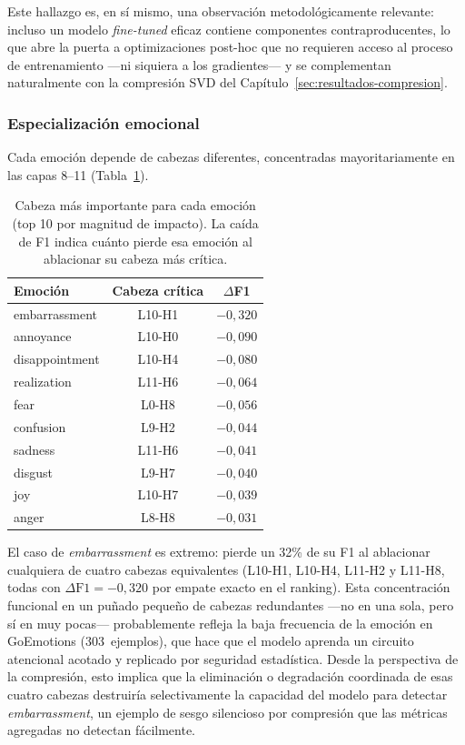 Este hallazgo es, en sí mismo, una observación metodológicamente
relevante: incluso un modelo \emph{fine-tuned} eficaz contiene componentes
contraproducentes, lo que abre la puerta a optimizaciones post-hoc
que no requieren acceso al proceso de entrenamiento ---ni siquiera a
los gradientes--- y se complementan naturalmente con la compresión
SVD del Capítulo~\ref{sec:resultados-compresion}.

\subsubsection{Especialización emocional}

Cada emoción depende de cabezas diferentes, concentradas
mayoritariamente en las capas 8--11
(Tabla~\ref{tab:head-emociones}).

\begin{table}[ht]
\centering
\caption{Cabeza más importante para cada emoción (top 10 por magnitud
de impacto). La caída de F1 indica cuánto pierde esa emoción al
ablacionar su cabeza más crítica.}
\label{tab:head-emociones}
\begin{tabular}{lcc}
\toprule
\textbf{Emoción} & \textbf{Cabeza crítica} & \textbf{$\Delta$F1} \\
\midrule
embarrassment  & L10-H1 & $-0{,}320$ \\
annoyance      & L10-H0 & $-0{,}090$ \\
disappointment & L10-H4 & $-0{,}080$ \\
realization    & L11-H6 & $-0{,}064$ \\
fear           & L0-H8  & $-0{,}056$ \\
confusion      & L9-H2  & $-0{,}044$ \\
sadness        & L11-H6 & $-0{,}041$ \\
disgust        & L9-H7  & $-0{,}040$ \\
joy            & L10-H7 & $-0{,}039$ \\
anger          & L8-H8  & $-0{,}031$ \\
\bottomrule
\end{tabular}
\end{table}

El caso de \emph{embarrassment} es extremo: pierde un 32\% de su F1
al ablacionar cualquiera de cuatro cabezas equivalentes
(L10-H1, L10-H4, L11-H2 y L11-H8, todas con $\Delta\text{F1} = -0{,}320$
por empate exacto en el ranking). Esta concentración funcional en un
puñado pequeño de cabezas redundantes ---no en una sola, pero sí en
muy pocas--- probablemente refleja la baja frecuencia de la emoción
en GoEmotions (303~ejemplos), que hace que el modelo aprenda un
circuito atencional acotado y replicado por seguridad estadística.
Desde la perspectiva de la compresión, esto implica que la eliminación
o degradación coordinada de esas cuatro cabezas destruiría
selectivamente la capacidad del modelo para detectar
\emph{embarrassment}, un ejemplo de sesgo silencioso por compresión
que las métricas agregadas no detectan fácilmente.

